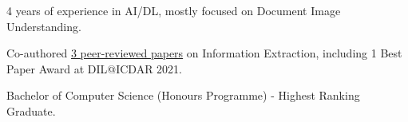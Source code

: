 
\begin{zitemize}
    \item 4 years of experience in AI/DL, mostly focused on Document Image Understanding.
    \item Co-authored \href{https://scholar.google.com/citations?user=iRZlaI8AAAAJ}{3 peer-reviewed papers} on Information Extraction, including 1 Best Paper Award at DIL@ICDAR 2021.
    \item Bachelor of Computer Science (Honours Programme) - Highest Ranking Graduate.
\end{zitemize}

